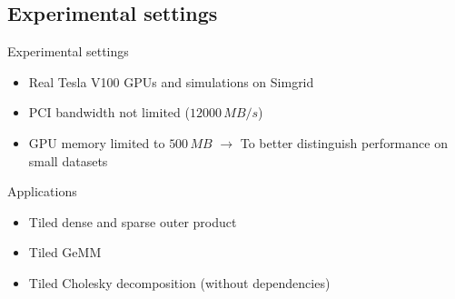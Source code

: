 \documentclass{libs/ufc_format}
\begin{document}
\subsection{Experimental settings}
\begin{frame}{Experimental settings}

        \begin{block}{}
            \begin{itemize}
				\item Real Tesla V100 GPUs and simulations on Simgrid
				\item PCI bandwidth not limited ($12000\,MB/s$)
				\item GPU memory limited to $500\,MB$ $\rightarrow$ To better distinguish performance on small datasets
			\end{itemize}
		\end{block}
			\begin{block}{Applications}
			\begin{itemize}
				\item Tiled dense and sparse outer product 
				\item Tiled GeMM
				\item Tiled Cholesky decomposition (without dependencies)
			\end{itemize}
			\end{block}
\end{frame}

\end{document}
